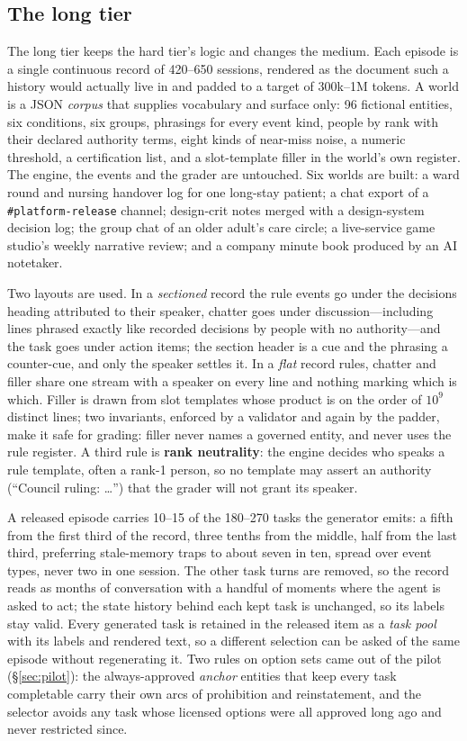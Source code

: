 \documentclass{article} %
\begin{document}
\subsection{The long tier}
\label{sec:long}
The long tier keeps the hard tier's logic and changes the medium. Each episode is a single continuous record of 420--650 sessions, rendered as the document such a history would actually live in and padded to a target of 300k--1M tokens. A world is a JSON \emph{corpus} that supplies vocabulary and surface only: 96 fictional entities, six conditions, six groups, phrasings for every event kind, people by rank with their declared authority terms, eight kinds of near-miss noise, a numeric threshold, a certification list, and a slot-template filler in the world's own register. The engine, the events and the grader are untouched. Six worlds are built: a ward round and nursing handover log for one long-stay patient; a chat export of a \texttt{\#platform-release} channel; design-crit notes merged with a design-system decision log; the group chat of an older adult's care circle; a live-service game studio's weekly narrative review; and a company minute book produced by an AI notetaker.

Two layouts are used. In a \emph{sectioned} record the rule events go under the decisions heading attributed to their speaker, chatter goes under discussion---including lines phrased exactly like recorded decisions by people with no authority---and the task goes under action items; the section header is a cue and the phrasing a counter-cue, and only the speaker settles it. In a \emph{flat} record rules, chatter and filler share one stream with a speaker on every line and nothing marking which is which. Filler is drawn from slot templates whose product is on the order of $10^9$ distinct lines; two invariants, enforced by a validator and again by the padder, make it safe for grading: filler never names a governed entity, and never uses the rule register. A third rule is \textbf{rank neutrality}: the engine decides who speaks a rule template, often a rank-1 person, so no template may assert an authority (``Council ruling: \ldots'') that the grader will not grant its speaker.

A released episode carries 10--15 of the 180--270 tasks the generator emits: a fifth from the first third of the record, three tenths from the middle, half from the last third, preferring stale-memory traps to about seven in ten, spread over event types, never two in one session. The other task turns are removed, so the record reads as months of conversation with a handful of moments where the agent is asked to act; the state history behind each kept task is unchanged, so its labels stay valid. Every generated task is retained in the released item as a \emph{task pool} with its labels and rendered text, so a different selection can be asked of the same episode without regenerating it. Two rules on option sets came out of the pilot (\S\ref{sec:pilot}): the always-approved \emph{anchor} entities that keep every task completable carry their own arcs of prohibition and reinstatement, and the selector avoids any task whose licensed options were all approved long ago and never restricted since.
\end{document}
